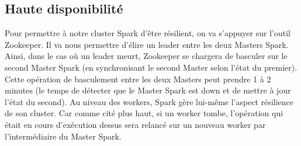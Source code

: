 \subsection{Haute disponibilité}
Pour permettre à notre cluster Spark d'être résilient, on va s'appuyer sur l'outil Zookeeper. Il va nous permettre d'élire un leader entre les deux Masters Spark. Ainsi, dans le cas où un leader meurt, Zookeeper se chargera de basculer sur le second Master Spark (en synchronisant le second Master selon l'état du premier). Cette opération de basculement entre les deux Masters peut prendre 1 à 2 minutes (le temps de détecter que le Master Spark est down et de mettre à jour l'état du second). 
Au niveau des workers, Spark gère lui-même l'aspect résilience de son cluster. Car comme cité plus haut, si un worker tombe, l'opération qui était en cours d'exécution dessus sera relancé sur un nouveau worker par l'intermédiaire du Master Spark.


